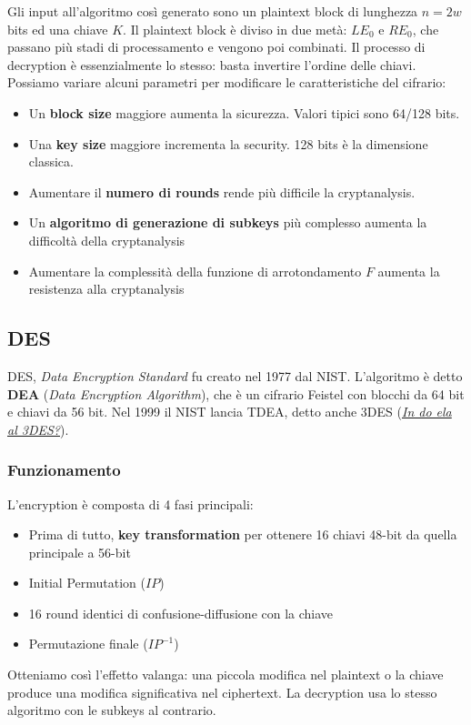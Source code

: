 \documentclass[11pt]{article}
\begin{document}
Gli input all'algoritmo così generato sono un plaintext block di lunghezza $n=2w$ bits ed una chiave $K$. Il plaintext block è diviso in due metà: $LE_0$ e $RE_0$, che passano più stadi di processamento e vengono poi combinati. 
Il processo di decryption è essenzialmente lo stesso: basta invertire l'ordine delle chiavi.
Possiamo variare alcuni parametri per modificare le caratteristiche del cifrario:
\begin{itemize}
    \item Un \textbf{block size} maggiore aumenta la sicurezza. Valori tipici sono 64/128 bits.
    \item Una \textbf{key size} maggiore incrementa la security. 128 bits è la dimensione classica.
    \item Aumentare il \textbf{numero di rounds} rende più difficile la cryptanalysis.
    \item Un \textbf{algoritmo di generazione di subkeys} più complesso aumenta la difficoltà della cryptanalysis
    \item Aumentare la complessità della funzione di arrotondamento $F$ aumenta la resistenza alla cryptanalysis
\end{itemize}
\subsection{DES}
DES, \textit{Data Encryption Standard} fu creato nel 1977 dal NIST. L'algoritmo è detto \textbf{DEA} (\textit{Data Encryption Algorithm}), che è un cifrario Feistel con blocchi da 64 bit e chiavi da 56 bit. Nel 1999 il NIST lancia TDEA, detto anche 3DES (\href{https://www.facebook.com/IPIUBELLELLIDIPARMA/videos/vl.2430501220562185/1326509910720610/?type=1}{\textit{In do ela al 3DES?}}). 
\subsubsection{Funzionamento}
L'encryption è composta di 4 fasi principali:
\begin{itemize}
    \item Prima di tutto, \textbf{key transformation} per ottenere 16 chiavi 48-bit da quella principale a 56-bit
    \item Initial Permutation ($IP$)
    \item 16 round identici di confusione-diffusione con la chiave 
    \item Permutazione finale ($IP^{-1}$)
\end{itemize}
Otteniamo così l'effetto valanga: una piccola modifica nel plaintext o la chiave produce una modifica significativa nel ciphertext. La decryption usa lo stesso algoritmo con le subkeys al contrario.
\end{document}
